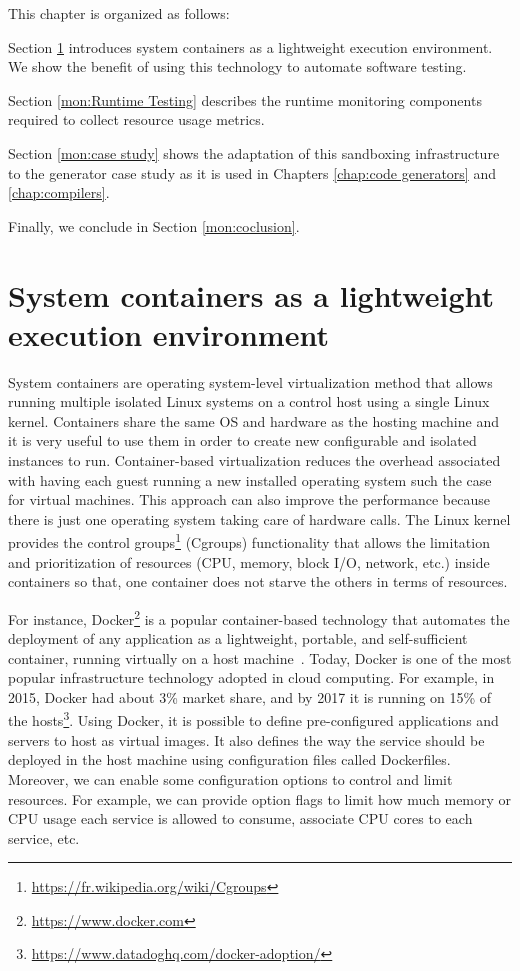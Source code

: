 This chapter is organized as follows: 

Section \ref{mon:System containers} introduces system containers as a lightweight execution environment. We show the benefit of using this technology to automate software testing.

Section \ref{mon:Runtime Testing} describes the runtime monitoring components required to collect resource usage metrics.

Section \ref{mon:case study} shows the adaptation of this sandboxing infrastructure to the generator case study as it is used in Chapters \ref{chap:code generators} and \ref{chap:compilers}.

Finally, we conclude in Section \ref{mon:coclusion}.


\section{System containers as a lightweight execution environment}
\label{mon:System containers}
System containers are operating system-level virtualization method that allows running multiple isolated Linux systems on a control host using a single Linux kernel. 
Containers share the same OS and hardware as the hosting machine and it is very useful to use them in order to create new configurable and isolated instances to run. 
Container-based virtualization reduces the overhead associated with having each guest running a new installed operating system such the case for virtual machines. This approach can also improve the performance because there is just one operating system taking care of hardware calls.
The Linux kernel provides the control groups\footnote{\url{https://fr.wikipedia.org/wiki/Cgroups}} (Cgroups) functionality that allows the limitation and prioritization of resources (CPU, memory, block I/O, network, etc.) inside containers so that, one container does not starve the others in terms of resources.

For instance, Docker\footnote{\url{https://www.docker.com}} is a popular container-based technology that automates the deployment of any application as a lightweight, portable, and self-sufficient container, running virtually on a host machine~\cite{merkel2014docker}. 
Today, Docker is one of the most popular infrastructure technology adopted in cloud computing\cite{peinl2016docker}. 
For example, in 2015, Docker had about 3\% market share, and by 2017 it is running on 15\% of the hosts\footnote{\url{https://www.datadoghq.com/docker-adoption/}}.
Using Docker, it is possible to define pre-configured applications and servers to host as virtual images. It also defines the way the service should be deployed in the host machine using configuration files called Dockerfiles. Moreover, we can enable some configuration options to control and limit resources. For example, we can provide option flags to limit how much memory or CPU usage each service is allowed to consume, associate CPU cores to each service, etc. 


